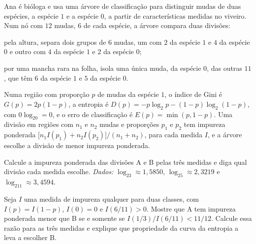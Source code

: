 Ana é bióloga e usa uma árvore de classificação para distinguir mudas de duas espécies, a
espécie $1$ e a espécie $0$, a partir de características medidas no viveiro. Num nó com $12$
mudas, $6$ de cada espécie, a árvore compara duas divisões:
\begin{description}[leftmargin=1.4cm,style=nextline]
  \item[A] pela altura, separa dois grupos de $6$ mudas, um com $2$ da espécie $1$ e $4$ da
        espécie $0$ e outro com $4$ da espécie $1$ e $2$ da espécie $0$;
  \item[B] por uma mancha rara na folha, isola uma única muda, da espécie $0$, das outras $11$,
        que têm $6$ da espécie $1$ e $5$ da espécie $0$.
\end{description}
Numa região com proporção $p$ de mudas da espécie $1$, o índice de Gini é $G(p)=2p(1-p)$, a
entropia é $D(p)=-p\log_2p-(1-p)\log_2(1-p)$, com $0\log_20=0$, e o erro de classificação é
$E(p)=\min(p,1-p)$. Uma divisão em regiões com $n_1$ e $n_2$ mudas e proporções $p_1$ e $p_2$
tem impureza ponderada $\big[n_1I(p_1)+n_2I(p_2)\big]/(n_1+n_2)$, para cada medida $I$, e a
árvore escolhe a divisão de menor impureza ponderada.
\begin{itens}
  \item {} Calcule a impureza ponderada das divisões A e B pelas três medidas e diga
        qual divisão cada medida escolhe. \emph{Dados:} $\log_23\approx1{,}5850$,
        $\log_25\approx2{,}3219$ e $\log_211\approx3{,}4594$.
  \item {} Seja $I$ uma medida de impureza qualquer para duas classes, com
        $I(p)=I(1-p)$, $I(0)=0$ e $I(6/11)>0$. Mostre que A tem impureza ponderada
        menor que B se e somente se $I(1/3)/I(6/11)<11/12$. Calcule essa razão para as
        três medidas e explique que propriedade da curva da entropia a leva a escolher B.
\end{itens}

